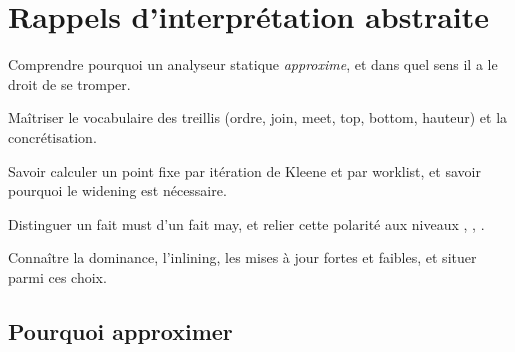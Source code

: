 \chapter{Rappels d'interprétation abstraite}
\label{chap:interpretation-abstraite}

\begin{objectifs}
  \item Comprendre pourquoi un analyseur statique \emph{approxime}, et dans quel sens il a le droit de se tromper.
  \item Maîtriser le vocabulaire des treillis (ordre, join, meet, top, bottom, hauteur) et la concrétisation.
  \item Savoir calculer un point fixe par itération de Kleene et par worklist, et savoir pourquoi le widening est nécessaire.
  \item Distinguer un fait must d'un fait may, et relier cette polarité aux niveaux \Error{}, \Warning{}, \Info{}.
  \item Connaître la dominance, l'inlining, les mises à jour fortes et faibles, et situer \reactant{} parmi ces choix.
\end{objectifs}


\section{Pourquoi approximer}
\label{sec:interpretation-abstraite-approximer}

